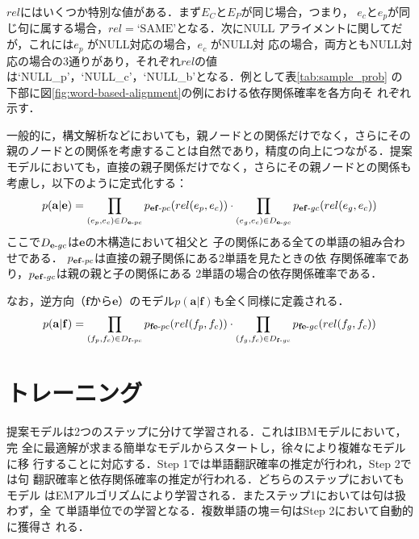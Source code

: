 \documentclass[japanese]{jnlp_1.4}
\begin{document}
$rel$にはいくつか特別な値がある．まず$E_C$と$E_P$が同じ場合，つまり，
$e_c$と$e_p$が同じ句に属する場合，$rel = \mbox{`SAME'}$となる．次にNULL 
アライメントに関してだが，これには$e_p$ がNULL対応の場合，$e_c$ がNULL対
応の場合，両方ともNULL対応の場合の3通りがあり，それぞれ$rel$の値は`NULL\_p'，`NULL\_c'，`NULL\_b'となる．例として表\ref{tab:sample_prob} の
下部に図\ref{fig:word-based-alignment}の例における依存関係確率を各方向そ
れぞれ示す．

一般的に，構文解析などにおいても，親ノードとの関係だけでなく，さらにその
親のノードとの関係を考慮することは自然であり，精度の向上につながる．提案
モデルにおいても，直接の親子関係だけでなく，さらにその親ノードとの関係も
考慮し，以下のように定式化する：
\begin{equation}
 p(\mathbf{a}|\mathbf{e}) = \prod_{(e_p,e_c) \in D_{\mathbf{e}\mathchar`-pc}} p_{\mathbf{ef}\mathchar`-pc}(rel(e_p, e_c)) \cdot \prod_{(e_g,e_c) \in D_{\mathbf{e}\mathchar`-gc}} p_{\mathbf{ef}\mathchar`-gc}(rel(e_g, e_c))
\end{equation}
ここで$D_{\mathbf{e}\mathchar`-gc}$は$\mathbf{e}$の木構造において祖父と
子の関係にある全ての単語の組み合わせである．
$p_{\mathbf{ef}\mathchar`-pc}$は直接の親子関係にある2単語を見たときの依
存関係確率であり，$p_{\mathbf{ef}\mathchar`-gc}$は親の親と子の関係にある
2単語の場合の依存関係確率である．

なお，逆方向（$\mathbf{f}$から$\mathbf{e}$）のモデル$p(\mathbf{a}|\mathbf{f})$も全く同様に定義される．
\pagebreak
\begin{equation}
 p(\mathbf{a}|\mathbf{f}) = \prod_{(f_p,f_c) \in D_{\mathbf{f}\mathchar`-pc}} p_{\mathbf{fe}\mathchar`-pc}(rel(f_p, f_c)) \cdot \prod_{(f_g,f_c) \in D_{\mathbf{f}\mathchar`-gc}} p_{\mathbf{fe}\mathchar`-gc}(rel(f_g, f_c))
\end{equation}



\section{トレーニング}
\label{training}

提案モデルは2つのステップに分けて学習される．これはIBMモデルにおいて，完
全に最適解が求まる簡単なモデルからスタートし，徐々により複雑なモデルに移
行することに対応する．Step 1では単語翻訳確率の推定が行われ，Step 2では句
翻訳確率と依存関係確率の推定が行われる．どちらのステップにおいてもモデル
はEMアルゴリズムにより学習される．またステップ1においては句は扱わず，全
て単語単位での学習となる．複数単語の塊＝句はStep 2において自動的に獲得さ
れる．
\end{document}
